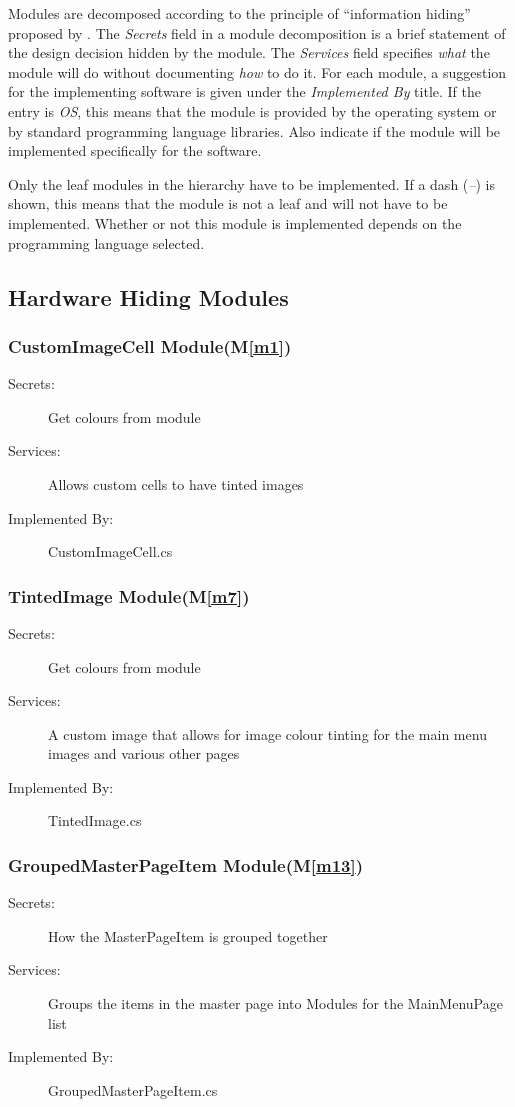 \documentclass[12pt, titlepage]{article}
\newcommand{\mref}[1]{M\ref{#1}}
\begin{document}
Modules are decomposed according to the principle of ``information hiding''
proposed by \citet{ParnasEtAl1984}. The \emph{Secrets} field in a module
decomposition is a brief statement of the design decision hidden by the
module. The \emph{Services} field specifies \emph{what} the module will do
without documenting \emph{how} to do it. For each module, a suggestion for the
implementing software is given under the \emph{Implemented By} title. If the
entry is \emph{OS}, this means that the module is provided by the operating
system or by standard programming language libraries.  Also indicate if the
module will be implemented specifically for the software.

Only the leaf modules in the
hierarchy have to be implemented. If a dash (\emph{--}) is shown, this means
that the module is not a leaf and will not have to be implemented. Whether or
not this module is implemented depends on the programming language
selected.

\subsection{Hardware Hiding Modules}
\subsubsection{CustomImageCell Module(\mref{m1})}
\begin{description}
\item[Secrets:]Get colours from module
\item[Services:]Allows custom cells to have tinted images
\item[Implemented By:] CustomImageCell.cs
\end{description}

\subsubsection{TintedImage Module(\mref{m7})}
\begin{description}
\item[Secrets:]Get colours from module
\item[Services:]A custom image that allows for image colour tinting for the main menu images and various other pages
\item[Implemented By:] TintedImage.cs
\end{description}

\subsubsection{GroupedMasterPageItem Module(\mref{m13})}
\begin{description}
\item[Secrets:]How the MasterPageItem is grouped together
\item[Services:]Groups the items in the master page into Modules for the MainMenuPage list
\item[Implemented By:] GroupedMasterPageItem.cs
\end{description}
\end{document}
